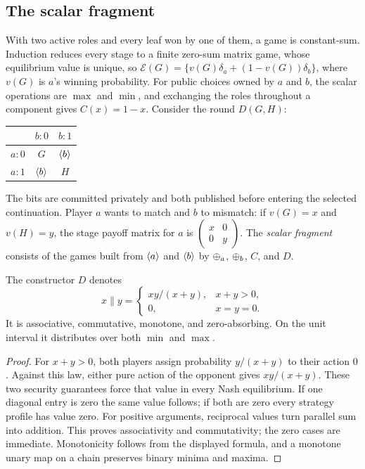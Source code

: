\subsection{The scalar fragment}\label{app:sealed-scalar}

With two active roles and every leaf won by one of them, a game is constant-sum. Induction reduces every stage to a finite zero-sum matrix game, whose equilibrium value is unique, so $\mathcal E(G)=\{v(G)\delta_a+(1-v(G))\delta_b\}$, where $v(G)$ is $a$'s winning probability. For public choices owned by $a$ and $b$, the scalar operations are $\max$ and $\min$, and exchanging the roles throughout a component gives $C(x)=1-x$. Consider the round $D(G,H)$:
\begin{center}
\begin{tabular}{c|cc}
 & $b:0$ & $b:1$\\\hline
$a:0$ & $G$ & $\langle b\rangle$\\
$a:1$ & $\langle b\rangle$ & $H$
\end{tabular}
\end{center}
The bits are committed privately and both published before entering the selected continuation. Player $a$ wants to match and $b$ to mismatch: if $v(G)=x$ and $v(H)=y$, the stage payoff matrix for $a$ is $\left(\begin{smallmatrix}x&0\\0&y\end{smallmatrix}\right)$. The \emph{scalar fragment} consists of the games built from $\langle a\rangle$ and $\langle b\rangle$ by $\mathbin{\oplus_{a}}$, $\mathbin{\oplus_{b}}$, $C$, and $D$.

\begin{proposition}\label{se:prop:parallel}
The constructor $D$ denotes
\[
 x\parallel y=
 \begin{cases}xy/(x+y),&x+y>0,\\0,&x=y=0.\end{cases}
\]
It is associative, commutative, monotone, and zero-absorbing. On the
unit interval it distributes over both $\min$ and $\max$.
\end{proposition}
\begin{proof}
For $x+y>0$, both players assign probability $y/(x+y)$ to their
action $0$. Against this law, either pure action of the opponent gives
$xy/(x+y)$. These two security guarantees force that value in every
Nash equilibrium. If one diagonal entry is zero the same value follows;
if both are zero every strategy profile has value zero.
For positive arguments, reciprocal values turn parallel sum into
addition. This proves associativity and commutativity; the zero cases
are immediate. Monotonicity follows from the displayed formula, and
a monotone unary map on a chain preserves binary minima and maxima.
\end{proof}

